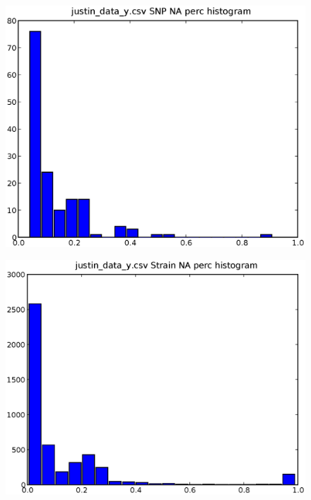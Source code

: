 \documentclass[a4paper,10pt]{article}
\begin{document}
\begin{figure}
\includegraphics[width=1\textwidth]{figures/justin_data_y_SNP_NA_perc.eps}
\caption{}\label{f4}
\end{figure}

\begin{figure}
\includegraphics[width=1\textwidth]{figures/justin_data_y_strain_NA_perc.eps}
\caption{}\label{f5}
\end{figure}
\end{document}
